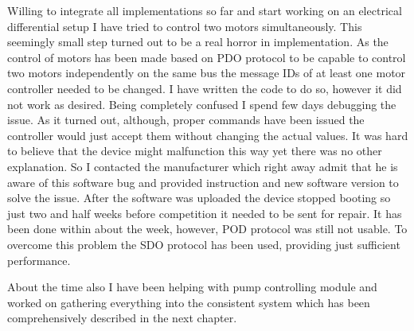 Willing to integrate all implementations so far and start working on an electrical differential setup I have tried to control two motors simultaneously. This seemingly small step turned out to be a real horror in implementation.
As the control of motors has been made based on PDO protocol to be capable to control two motors independently on the same bus the message IDs of at least one motor controller needed to be changed. I have written the code to do so, however it did not work as desired. Being completely confused I spend few days debugging the issue. 
As it turned out, although, proper commands have been issued the controller would just accept them without changing the actual values. It was hard to believe that the device might malfunction this way yet there was no other explanation. So I contacted the manufacturer which right away admit that he is aware of this software bug and provided instruction and new software version to solve the issue.
After the software was uploaded the device stopped booting so just two and half weeks before competition it needed to be sent for repair. It has been done within about the week, however, POD protocol was still not usable.
To overcome this problem the SDO protocol has been used, providing just sufficient performance.

About the time also I have been helping with pump controlling module and worked on gathering everything into the consistent system which has been comprehensively described in the next chapter.